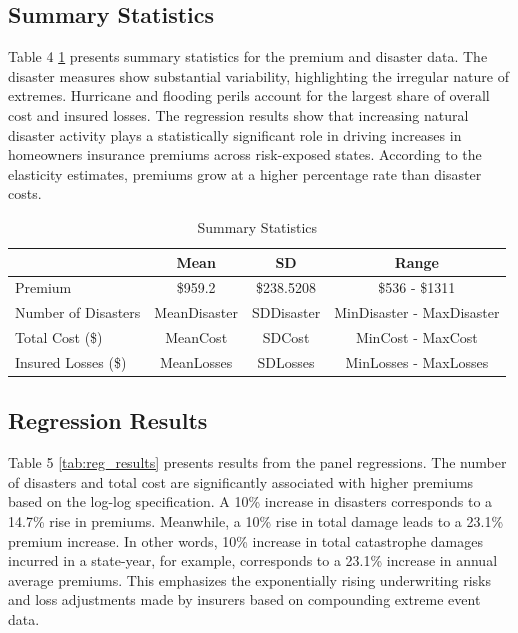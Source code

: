 \documentclass[12pt]{article}
\begin{document}
\subsection{Summary Statistics}
Table 4 \ref{tab:summary} presents summary statistics for the premium and disaster data. The disaster measures show substantial variability, 
highlighting the irregular nature of extremes. Hurricane and flooding perils account for the largest share of overall cost and 
insured losses. The regression results show that increasing natural disaster activity plays a statistically significant role in 
driving increases in homeowners insurance premiums across risk-exposed states. According to the elasticity estimates, premiums grow 
at a higher percentage rate than disaster costs.

\begin{table}[h]
    \label{tab:summary}
    \centering
    \begin{tabular}{|l|c|c|c|}
        \hline
        & Mean & SD & Range \\
        \hline
        Premium & \$\num{959.2} & \$\num{238.5208} & \$\num{536} - \$\num{1311} \\
        Number of Disasters & MeanDisaster & SDDisaster & MinDisaster - MaxDisaster \\
        Total Cost (\$) & MeanCost & SDCost & MinCost - MaxCost \\
        Insured Losses (\$) & MeanLosses & SDLosses & MinLosses - MaxLosses \\
        \hline
    \end{tabular}
    \caption{Summary Statistics}
    \cite{statista, ncei, FEMA}
\end{table}

\subsection{Regression Results}
Table 5 \ref{tab:reg_results} presents results from the panel regressions. The number of disasters and total cost are significantly 
associated with higher premiums based on the log-log specification. A 10\% increase in disasters corresponds to a 14.7\% rise in 
premiums. Meanwhile, a 10\% rise in total damage leads to a 23.1\% premium increase. In other words, 10\% increase in total catastrophe 
damages incurred in a state-year, for example, corresponds to a 23.1\% increase in annual average premiums. This emphasizes the 
exponentially rising underwriting risks and loss adjustments made by insurers based on compounding extreme event data.
\end{document}
